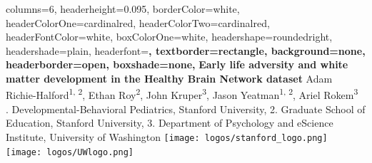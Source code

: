 \documentclass[a0paper,landscape,fontscale=0.385]{baposter}
\begin{document}
\begin{poster}{
    columns=6,
    headerheight=0.095\textheight,
    borderColor=white, %
    headerColorOne=cardinalred, %
    headerColorTwo=cardinalred, %
    headerFontColor=white, %
    boxColorOne=white, %
    headershape=roundedright, %
    headershade=plain, %
    headerfont=\Large\sf\bf, %
    textborder=rectangle,
    background=none,
    headerborder=open, %
    boxshade=none,
}
{}
%
%
{\sf\bf %
Early life adversity and white matter development %
in the Healthy Brain Network dataset
\hfill %
\null %
} %
{%
    \vspace{0.4em}
    Adam Richie-Halford\textsuperscript{1, 2}, %
    Ethan Roy\textsuperscript{2}, %
    John Kruper\textsuperscript{3}, %
    Jason Yeatman\textsuperscript{1, 2}, %
    Ariel Rokem\textsuperscript{3} \hfill \null \\
    {. Developmental-Behavioral Pediatrics, Stanford University, %
        2. Graduate School of Education, Stanford University, %
        3. Department of Psychology and eScience Institute, University of Washington %
        \hfill \null
    }
} %
{%
\texttt{[image: logos/stanford\_logo.png]}%
\hspace{0.25em}
\texttt{[image: logos/UWlogo.png]}%
} %


\end{poster}
\end{document}
